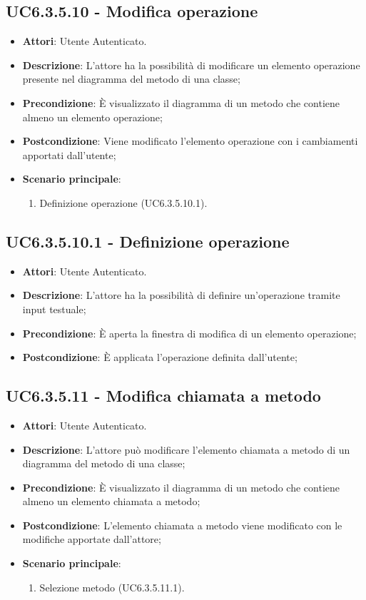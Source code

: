 \subsection{UC6.3.5.10 - Modifica operazione} 
\label{ssec:UC6.3.5.10} 
\begin{itemize} 
\item \textbf{Attori}: Utente Autenticato.
\item \textbf{Descrizione}: L'attore ha la possibilità di modificare un elemento operazione presente nel diagramma del metodo di una classe;
\item \textbf{Precondizione}: È visualizzato il diagramma di un metodo che contiene almeno un elemento operazione;
\item \textbf{Postcondizione}: Viene modificato l'elemento operazione con i cambiamenti apportati dall'utente;
\item \textbf{Scenario principale}: \begin{enumerate}\item Definizione operazione (UC6.3.5.10.1). 
 \end{enumerate}
\end{itemize} 
\subsection{UC6.3.5.10.1 - Definizione operazione} 
\label{ssec:UC6.3.5.10.1} 
\begin{itemize} 
\item \textbf{Attori}: Utente Autenticato.
\item \textbf{Descrizione}: L'attore ha la possibilità di definire un'operazione tramite input testuale;
\item \textbf{Precondizione}: È aperta la finestra di modifica di un elemento operazione;
\item \textbf{Postcondizione}: È applicata l'operazione definita dall'utente;
\end{itemize} 
\subsection{UC6.3.5.11 - Modifica chiamata a metodo} 
\label{ssec:UC6.3.5.11} 
\begin{itemize} 
\item \textbf{Attori}: Utente Autenticato.
\item \textbf{Descrizione}: L'attore può modificare l'elemento chiamata a metodo di un diagramma del metodo di una classe;
\item \textbf{Precondizione}: È visualizzato il diagramma di un metodo che contiene almeno un elemento chiamata a metodo;
\item \textbf{Postcondizione}: L'elemento chiamata a metodo viene modificato con le modifiche apportate dall'attore;
\item \textbf{Scenario principale}: \begin{enumerate}\item Selezione metodo (UC6.3.5.11.1). 
 \end{enumerate}
\end{itemize} 
